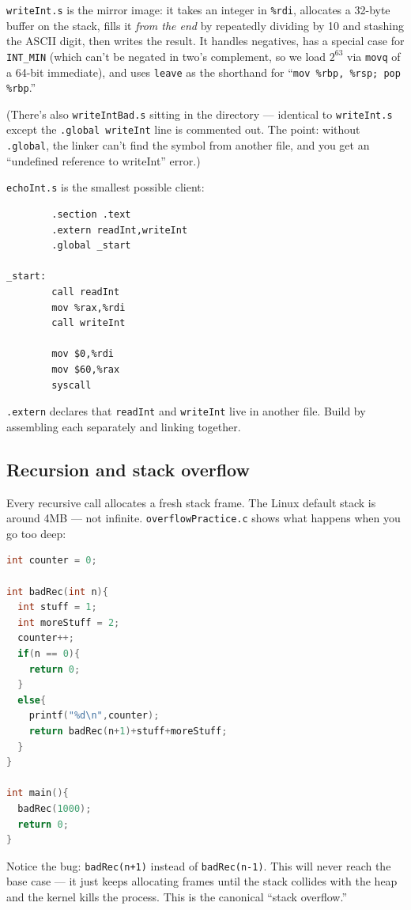 \documentclass[11pt]{article}
\begin{document}
\texttt{writeInt.s} is the mirror image: it takes an integer in
\texttt{\%rdi}, allocates a 32-byte buffer on the stack, fills it
\emph{from the end} by repeatedly dividing by 10 and stashing the
ASCII digit, then writes the result. It handles negatives, has a
special case for \texttt{INT\_MIN} (which can't be negated in
two's complement, so we load $2^{63}$ via \texttt{movq} of a 64-bit
immediate), and uses \texttt{leave} as the shorthand for
``\texttt{mov \%rbp, \%rsp; pop \%rbp}.''

(There's also \texttt{writeIntBad.s} sitting in the directory ---
identical to \texttt{writeInt.s} except the \texttt{.global writeInt}
line is commented out. The point: without \texttt{.global}, the
linker can't find the symbol from another file, and you get an
``undefined reference to writeInt'' error.)

\texttt{echoInt.s} is the smallest possible client:

\begin{lstlisting}
        .section .text
        .extern readInt,writeInt
        .global _start

_start:
        call readInt
        mov %rax,%rdi
        call writeInt

        mov $0,%rdi
        mov $60,%rax
        syscall
\end{lstlisting}

\texttt{.extern} declares that \texttt{readInt} and \texttt{writeInt}
live in another file. Build by assembling each separately and
linking together.

\subsection*{Recursion and stack overflow}

Every recursive call allocates a fresh stack frame. The Linux
default stack is around 4MB --- not infinite. \texttt{overflowPractice.c}
shows what happens when you go too deep:

\begin{lstlisting}[language=C]
int counter = 0;

int badRec(int n){
  int stuff = 1;
  int moreStuff = 2;
  counter++;
  if(n == 0){
    return 0;
  }
  else{
    printf("%d\n",counter);
    return badRec(n+1)+stuff+moreStuff;
  }
}

int main(){
  badRec(1000);
  return 0;
}
\end{lstlisting}

Notice the bug: \texttt{badRec(n+1)} instead of \texttt{badRec(n-1)}.
This will never reach the base case --- it just keeps allocating
frames until the stack collides with the heap and the kernel kills
the process. This is the canonical ``stack overflow.''
\end{document}
